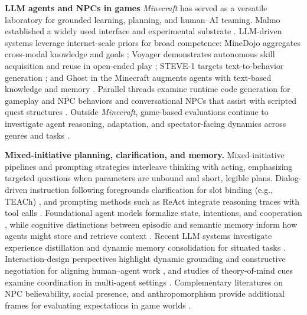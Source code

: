 \noindent\textbf{LLM agents and NPCs in games}
\emph{Minecraft} has served as a versatile laboratory for grounded learning, planning, and human–AI teaming. Malmo established a widely used interface and experimental substrate \citep{johnson2016the,hofmann2019minecraft}. LLM-driven systems leverage internet-scale priors for broad competence: MineDojo aggregates cross-modal knowledge and goals \citep{fan2022minedojo}; Voyager demonstrates autonomous skill acquisition and reuse in open-ended play \citep{wang2023voyager}; STEVE-1 targets text-to-behavior generation \citep{lifshitz2024steve1generativemodeltexttobehavior}; and Ghost in the Minecraft augments agents with text-based knowledge and memory \citep{zhu2023ghostminecraftgenerallycapable}. Parallel threads examine runtime code generation for gameplay and NPC behaviors \citep{Jennings2024,volum-etal-2022-craft} and conversational NPCs that assist with scripted quest structures \citep{rao2024minecraftQuest}. Outside \emph{Minecraft}, game-based evaluations continue to investigate agent reasoning, adaptation, and spectator-facing dynamics across genres and tasks \citep{cheung2011starcraft,yannakakis2018artificial}.

\noindent\textbf{Mixed-initiative planning, clarification, and memory.}
Mixed-initiative pipelines and prompting strategies interleave thinking with acting, emphasizing targeted questions when parameters are unbound and short, legible plans. Dialog-driven instruction following foregrounds clarification for slot binding (e.g., TEACh) \citep{teach2021}, and prompting methods such as ReAct integrate reasoning traces with tool calls \citep{yaoproreact2023}. Foundational agent models formalize state, intentions, and cooperation \citep{Wooldridge_Jennings_1995}, while cognitive distinctions between episodic and semantic memory inform how agents might store and retrieve context \citep{tulving1983elements,tulving1985memory}. Recent LLM systems investigate experience distillation and dynamic memory consolidation for situated tasks \citep{sarch2024vlm, Hou_2024}. Interaction-design perspectives highlight dynamic grounding and constructive negotiation for aligning human–agent work \citep{vaithilingam2024imagining}, and studies of theory-of-mind cues examine coordination in multi-agent settings \citep{li2023theory}. Complementary literatures on NPC believability, social presence, and anthropomorphism provide additional frames for evaluating expectations in game worlds \citep{articleonnpdbeilievability, Nowak2003}.
